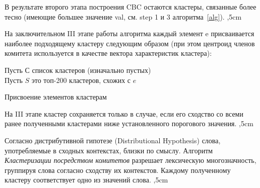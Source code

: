 \documentclass{article}
\begin{document}
\begin{articletext}
В результате второго этапа построения CBC остаются кластеры, связанные более тесно (имеющие большее значение val, см. step 1 и 3 алгоритма~\ref{alg}).
,5cm

На заключительном III этапе работы алгоритма каждый элемент e присваивается наиболее подходящему кластеру следующим образом (при этом центроид членов комитета используется в качестве вектора характеристик кластера):

\bfullwidth
\begin{algorithm}[H]
\SetAlgoLined

Пусть $С$ список кластеров (изначально пустых)\\
Пусть $S$ это топ-200 кластеров, схожих с $e$\\
\caption{Присвоение элементов кластерам}
\label{alg1}
\end{algorithm}
\efullwidth

На III этапе кластер сохраняется только в случае, если его сходство со всеми ранее полученными кластерами ниже установленного порогового значения.
,5cm

Согласно дистрибутивной гипотезе (Distributional Hypothesis) \cite{Harris 1985} слова, употребляемые в сходных контекстах, близки по смыслу. Алгоритм \textit{Кластеризации посредством комитетов} \cite{Pantel 2002} разрешает лексическую многозначность, группируя слова согласно сходству их контекстов. Каждому полученному кластеру соответствует одно из значений слова.
,5cm



\end{articletext}
\end{document}
